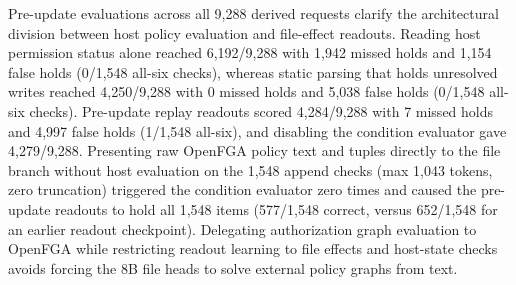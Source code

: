 Pre-update evaluations across all 9,288 derived requests clarify the architectural division between host policy evaluation and file-effect readouts. Reading host permission status alone reached 6,192/9,288 with 1,942 missed holds and 1,154 false holds (0/1,548 all-six checks), whereas static parsing that holds unresolved writes reached 4,250/9,288 with 0 missed holds and 5,038 false holds (0/1,548 all-six checks). Pre-update replay readouts scored 4,284/9,288 with 7 missed holds and 4,997 false holds (1/1,548 all-six), and disabling the condition evaluator gave 4,279/9,288. Presenting raw OpenFGA policy text and tuples directly to the file branch without host evaluation on the 1,548 append checks (max 1,043 tokens, zero truncation) triggered the condition evaluator zero times and caused the pre-update readouts to hold all 1,548 items (577/1,548 correct, versus 652/1,548 for an earlier readout checkpoint). Delegating authorization graph evaluation to OpenFGA while restricting readout learning to file effects and host-state checks avoids forcing the 8B file heads to solve external policy graphs from text.

